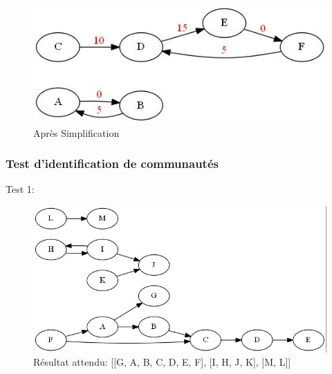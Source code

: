 \documentclass[12pt, oneside]{article}
\begin{document}
\begin{figure}[!h]
    \centering
    \includegraphics[scale=0.7,trim=3 3 3 3,clip]{simplify2after}
    \caption{Après Simplification}
\end{figure}
\newpage
\FloatBarrier
\subsubsection{Test d'identification de communautés}
Test 1:
\begin{figure}[!h]
    \centering
    \includegraphics[scale=0.7,trim=3 3 3 3,clip]{community1}
    \caption{Résultat attendu: [[G, A, B, C, D, E, F], [I, H, J, K], [M, L]]}
\end{figure}
\newpage
\FloatBarrier
\end{document}

